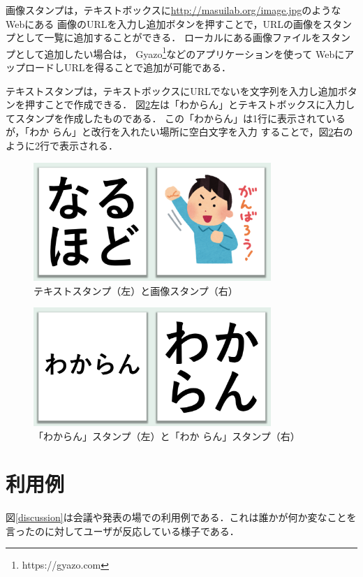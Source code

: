 画像スタンプは，テキストボックスに\url{http://masuilab.org/image.jpg}のようなWebにある
画像のURLを入力し追加ボタンを押すことで，URLの画像をスタンプとして一覧に追加することができる．
ローカルにある画像ファイルをスタンプとして追加したい場合は，
Gyazo\footnote{https://gyazo.com}などのアプリケーションを使って
WebにアップロードしURLを得ることで追加が可能である．

テキストスタンプは，テキストボックスにURLでないを文字列を入力し追加ボタンを押すことで作成できる．
図\ref{wakaran}左は「わからん」とテキストボックスに入力してスタンプを作成したものである．
この「わからん」は1行に表示されているが，「わか らん」と改行を入れたい場所に空白文字を入力
することで，図\ref{wakaran}右のように2行で表示される．


\begin{figure}[h]
\centering
\includegraphics[width=9cm]{images/stamp.png}
\caption{テキストスタンプ（左）と画像スタンプ（右）}
\label{stamp}
\end{figure}

\begin{figure}[h]
\centering
\includegraphics[width=9cm]{images/wakaran.png}
\caption{「わからん」スタンプ（左）と「わか らん」スタンプ（右）}
\label{wakaran}
\end{figure}

\section{利用例}
図\ref{discussion}は会議や発表の場での利用例である．これは誰かが何か変なことを言ったのに対してユーザが反応している様子である．

